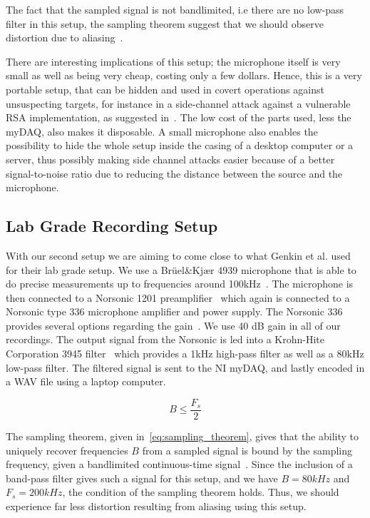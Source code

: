 The fact that the sampled signal is not bandlimited, i.e there are no low-pass filter in this setup, the sampling theorem suggest that we should observe distortion due to aliasing~\cite{proakis2007digital}.

There are interesting implications of this setup; the microphone itself is very small as well as being very cheap, costing only a few dollars. 
Hence, this is a very portable setup, that can be hidden and used in covert operations against unsuspecting targets, for instance in a side-channel attack against a vulnerable RSA implementation, as suggested in~\cite{DBLP:conf/crypto/GenkinST14}.
The low cost of the parts used, less the myDAQ, also makes it disposable.
A small microphone also enables the possibility to hide the whole setup inside the casing of a desktop computer or a server, thus possibly making side channel attacks easier because of a better signal-to-noise ratio due to reducing the distance between the source and the microphone.


\subsection{Lab Grade Recording Setup}\label{chp3:sec:bruel_kjaer_configuration}
With our second setup we are aiming to come close to what Genkin et al. used for their lab grade setup.
We use a Brüel\&Kjær 4939 microphone that is able to do precise measurements up to frequencies around 100kHz~\cite{url:bk4939_spec}.
The microphone is then connected to a Norsonic 1201 preamplifier~\cite{url:norsonic1201_spec} which again is connected to a Norsonic type 336 microphone amplifier and power supply.
The Norsonic 336 provides several options regarding the gain~\cite{url:nor336_spec}. 
We use 40 dB gain in all of our recordings.
The output signal from the Norsonic is led into a Krohn-Hite Corporation 3945 filter~\cite{url:krohn-hite3945_spec} which provides a 1kHz high-pass filter as well as a 80kHz low-pass filter.
The filtered signal is sent to the \gls{NI} myDAQ, and lastly encoded in a WAV file using a laptop computer. 

\begin{equation}\label{eq:sampling_theorem}
B \leq \frac{F_{s}}{2}
\end{equation}

The sampling theorem, given in~\autoref{eq:sampling_theorem}, gives that the ability to uniquely recover frequencies $B$ from a sampled signal is bound by the sampling frequency, given a bandlimited continuous-time signal~\cite{proakis2007digital}.
Since the inclusion of a band-pass filter gives such a signal for this setup, and we have $B = 80kHz$ and $F_s = 200kHz$, the condition of the sampling theorem holds.
Thus, we should experience far less distortion resulting from aliasing using this setup.


